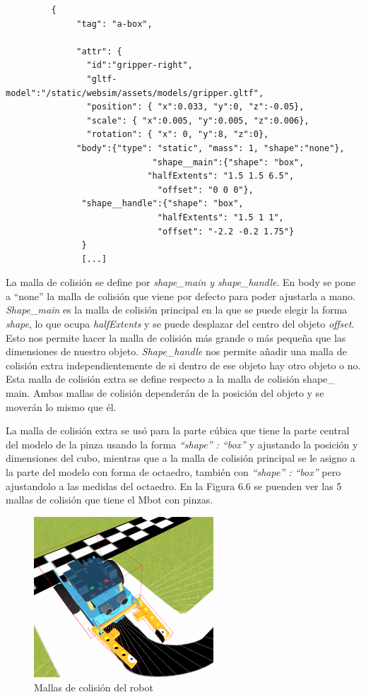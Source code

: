 \begin{lstlisting}         
         {
              "tag": "a-box",

              "attr": {
                "id":"gripper-right",
		        "gltf-model":"/static/websim/assets/models/gripper.gltf",
                "position": { "x":0.033, "y":0, "z":-0.05},
                "scale": { "x":0.005, "y":0.005, "z":0.006},
                "rotation": { "x": 0, "y":8, "z":0},
 			  "body":{"type": "static", "mass": 1, "shape":"none"},
                             "shape__main":{"shape": "box",
			                "halfExtents": "1.5 1.5 6.5",
                              "offset": "0 0 0"},
		       "shape__handle":{"shape": "box",
                              "halfExtents": "1.5 1 1",
                              "offset": "-2.2 -0.2 1.75"}
               }
               [...]
\end{lstlisting}


La malla de colisión se define por \textit{shape\_main y shape\_handle}. En body se pone a ``none'' la malla de colisión que viene por defecto para poder ajustarla a mano.
\textit{Shape\_main} es la malla de colisión principal en la que se puede elegir la forma \textit{shape}, lo que ocupa \textit{halfExtents} y se puede desplazar del centro del objeto \textit{offset}. Esto nos permite hacer la malla de colisión más grande o más pequeña que las dimensiones de nuestro objeto. \textit{ Shape\_handle} nos permite añadir una malla de colisión extra independientemente de si dentro de ese  objeto hay otro objeto o no. Esta malla de colisión extra se define respecto a la malla de colisión shape\_ main. Ambas mallas de colisión dependerán de la posición del objeto y se moverán lo mismo que él.

La malla de colisión extra se usó para la parte cúbica que tiene la parte central del modelo de la pinza usando la forma  \textit{ ``shape'' : ``box''} y ajustando  la posición y dimensiones del cubo, mientras que a la malla de colisión principal se le asigno a la parte del modelo con forma de octaedro, también con \textit{ ``shape'' : ``box''} pero ajustandolo a las medidas del octaedro. En la Figura  6.6 se puenden ver las 5 mallas de colisión que tiene el Mbot con pinzas.

 \begin{figure}[H]
  \centering
 \includegraphics[width=0.6\textwidth, height=0.5\textwidth]{chapters/images/mallas.png}
  \caption{Mallas de colisión del robot}
\end{figure}

